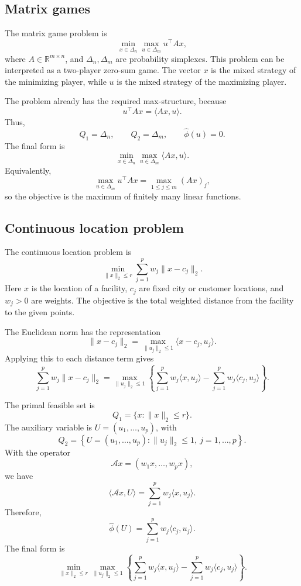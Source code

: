 \documentclass[11pt]{article}
\begin{document}
\subsection{Matrix games}

The matrix game problem is
\[
    \min_{x\in\Delta_n}
    \max_{u\in\Delta_m}
    u^\top Ax,
\]
where \(A\in\mathbb{R}^{m\times n}\), and \(\Delta_n,\Delta_m\) are probability
simplexes. This problem can be interpreted as a two-player zero-sum game. The
vector \(x\) is the mixed strategy of the minimizing player, while \(u\) is the
mixed strategy of the maximizing player.

The problem already has the required max-structure, because
\[
    u^\top Ax=\langle Ax,u\rangle.
\]
Thus,
\[
    Q_1=\Delta_n,
    \qquad
    Q_2=\Delta_m,
    \qquad
    \hat\phi(u)=0.
\]
The final form is
\[
    \boxed{
    \min_{x\in\Delta_n}
    \max_{u\in\Delta_m}
    \langle Ax,u\rangle .
    }
\]
Equivalently,
\[
    \max_{u\in\Delta_m}u^\top Ax
    =
    \max_{1\le j\le m}(Ax)_j,
\]
so the objective is the maximum of finitely many linear functions.

\subsection{Continuous location problem}

The continuous location problem is
\[
    \min_{\|x\|_2\le r}
    \sum_{j=1}^{p}w_j\|x-c_j\|_2.
\]
Here \(x\) is the location of a facility, \(c_j\) are fixed city or customer
locations, and \(w_j>0\) are weights. The objective is the total weighted
distance from the facility to the given points.

The Euclidean norm has the representation
\[
    \|x-c_j\|_2
    =
    \max_{\|u_j\|_2\le 1}
    \langle x-c_j,u_j\rangle.
\]
Applying this to each distance term gives
\[
    \sum_{j=1}^{p}w_j\|x-c_j\|_2
    =
    \max_{\|u_j\|_2\le 1}
    \left\{
        \sum_{j=1}^{p}w_j\langle x,u_j\rangle
        -
        \sum_{j=1}^{p}w_j\langle c_j,u_j\rangle
    \right\}.
\]

The primal feasible set is
\[
    Q_1=\{x:\|x\|_2\le r\}.
\]
The auxiliary variable is \(U=(u_1,\ldots,u_p)\), with
\[
    Q_2=
    \left\{
        U=(u_1,\ldots,u_p):
        \|u_j\|_2\le 1,\ j=1,\ldots,p
    \right\}.
\]
With the operator
\[
    \mathcal A x=(w_1x,\ldots,w_px),
\]
we have
\[
    \langle \mathcal A x,U\rangle
    =
    \sum_{j=1}^{p}w_j\langle x,u_j\rangle.
\]
Therefore,
\[
    \hat\phi(U)=
    \sum_{j=1}^{p}w_j\langle c_j,u_j\rangle.
\]
The final form is
\[
    \boxed{
    \min_{\|x\|_2\le r}
    \max_{\|u_j\|_2\le 1}
    \left\{
        \sum_{j=1}^{p}w_j\langle x,u_j\rangle
        -
        \sum_{j=1}^{p}w_j\langle c_j,u_j\rangle
    \right\}.
    }
\]
\end{document}
